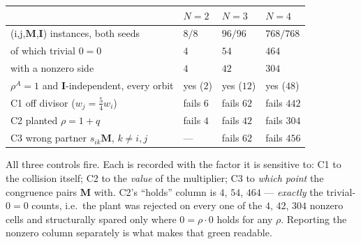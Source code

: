 \documentclass[11pt]{article}
\theoremstyle{plain}
\theoremstyle{definition}
\theoremstyle{remark}
\theoremstyle{plain}
\newcommand{\bI}{\mathbf{I}}
\newcommand{\bM}{\mathbf{M}}
\begin{document}
\begin{center}\small
\begin{tabular}{llll}
\toprule
 & $N=2$ & $N=3$ & $N=4$ \\\midrule
(i,j,$\bM$,$\bI$) instances, both seeds & $8/8$ & $96/96$ & $768/768$ \\
of which trivial $0=0$ & $4$ & $54$ & $464$ \\
with a nonzero side & $4$ & $42$ & $304$ \\
$\rho^A=1$ and $\bI$-independent, every orbit & yes ($2$) & yes ($12$) & yes ($48$) \\\midrule
C1 off divisor ($w_j=\tfrac54w_i$) & fails $6$ & fails $62$ & fails $442$ \\
C2 planted $\rho=1+q$ & fails $4$ & fails $42$ & fails $304$ \\
C3 wrong partner $s_{ik}\bM$, $k\ne i,j$ & --- & fails $62$ & fails $456$ \\
\bottomrule
\end{tabular}
\end{center}

All three controls fire.  Each is recorded with the factor it is sensitive to:
C1 to the collision itself; C2 to the \emph{value} of the multiplier; C3 to
\emph{which point} the congruence pairs $\bM$ with.  C2's ``holds'' column is
$4$, $54$, $464$ --- \emph{exactly} the trivial-$0=0$ counts, i.e.\ the plant was
rejected on every one of the $4$, $42$, $304$ nonzero cells and structurally
spared only where $0=\rho\cdot0$ holds for any $\rho$.  Reporting the nonzero
column separately is what makes that green readable.
\end{document}
